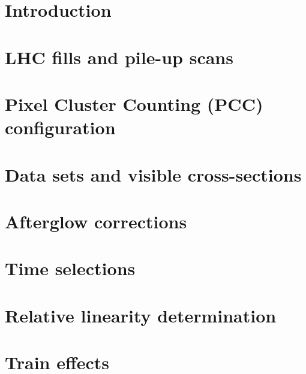 \maketitle %
\section{Introduction}

\section{LHC fills and pile-up scans}

\clearpage
\newpage
\section{Pixel Cluster Counting (PCC) configuration}

\clearpage
\newpage
\section{Data sets and visible cross-sections}

\clearpage
\newpage
\section{Afterglow corrections}

\clearpage
\newpage
\section{Time selections}

\clearpage
\newpage
\section{Relative linearity determination}

\clearpage
\newpage
\section{Train effects}

\clearpage
\newpage
